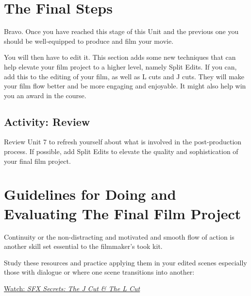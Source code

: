 \documentclass[
  letterpaper,
  DIV=11,
  numbers=noendperiod]{scrreprt}
\begin{document}
\section{The Final Steps}\label{the-final-steps}

Bravo. Once you have reached this stage of this Unit and the previous
one you should be well-equipped to produce and film your movie.

You will then have to edit it. This section adds some new techniques
that can help elevate your film project to a higher level, namely Split
Edits. If you can, add this to the editing of your film, as well as L
cuts and J cuts. They will make your film flow better and be more
engaging and enjoyable. It might also help win you an award in the
course.

\subsection{Activity: Review}\label{activity-review}

\begin{tcolorbox}[enhanced jigsaw, opacityback=0, colframe=quarto-callout-note-color-frame, leftrule=.75mm, arc=.35mm, rightrule=.15mm, colbacktitle=quarto-callout-note-color!10!white, titlerule=0mm, colback=white, toprule=.15mm, bottomtitle=1mm, breakable, toptitle=1mm, title={Learning Activity}, coltitle=black, bottomrule=.15mm, left=2mm, opacitybacktitle=0.6]

Review Unit 7 to refresh yourself about what is involved in the
post-production process. If possible, add Split Edits to elevate the
quality and sophistication of your final film project.

\end{tcolorbox}

\section{Guidelines for Doing and Evaluating The Final Film
Project}\label{guidelines-for-doing-and-evaluating-the-final-film-project}

Continuity or the non-distracting and motivated and smooth flow of
action is another skill set essential to the filmmaker's took kit.

Study these resources and practice applying them in your edited scenes
especially those with dialogue or where one scene transitions into
another:

\href{https://www.youtube.com/watch?v=eyH-a964kAs}{Watch: \emph{SFX
Secrets: The J Cut \& The L Cut}}
\end{document}
